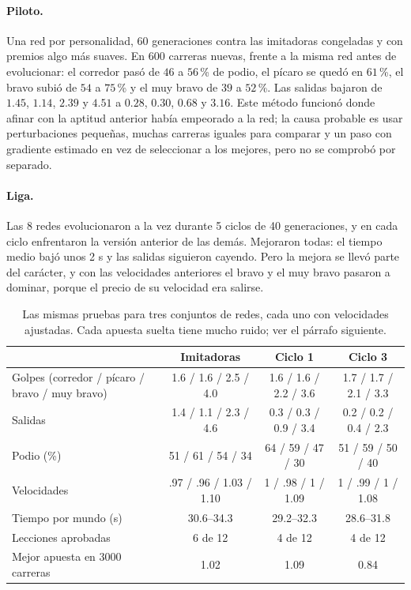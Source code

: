 \documentclass[11pt,letterpaper]{article}
\begin{document}
\paragraph{Piloto.} Una red por personalidad, 60 generaciones contra las imitadoras congeladas y con premios algo más suaves. En 600 carreras nuevas, frente a la misma red antes de evolucionar: el corredor pasó de $46$ a $56$\,\% de podio, el pícaro se quedó en $61$\,\%, el bravo subió de $54$ a $75$\,\% y el muy bravo de $39$ a $52$\,\%. Las salidas bajaron de $1.45$, $1.14$, $2.39$ y $4.51$ a $0.28$, $0.30$, $0.68$ y $3.16$. Este método funcionó donde afinar con la aptitud anterior había empeorado a la red; la causa probable es usar perturbaciones pequeñas, muchas carreras iguales para comparar y un paso con gradiente estimado en vez de seleccionar a los mejores, pero no se comprobó por separado.

\paragraph{Liga.} Las 8 redes evolucionaron a la vez durante 5 ciclos de 40 generaciones, y en cada ciclo enfrentaron la versión anterior de las demás. Mejoraron todas: el tiempo medio bajó unos 2 s y las salidas siguieron cayendo. Pero la mejora se llevó parte del carácter, y con las velocidades anteriores el bravo y el muy bravo pasaron a dominar, porque el precio de su velocidad era salirse.

\begin{table}[h]\centering\small
\begin{tabular}{lccc}
\toprule
 & Imitadoras & Ciclo 1 & Ciclo 3 \\
\midrule
Golpes (corredor / pícaro / bravo / muy bravo) & 1.6 / 1.6 / 2.5 / 4.0 & 1.6 / 1.6 / 2.2 / 3.6 & 1.7 / 1.7 / 2.1 / 3.3 \\
Salidas & 1.4 / 1.1 / 2.3 / 4.6 & 0.3 / 0.3 / 0.9 / 3.4 & 0.2 / 0.2 / 0.4 / 2.3 \\
Podio (\%) & 51 / 61 / 54 / 34 & 64 / 59 / 47 / 30 & 51 / 59 / 50 / 40 \\
Velocidades & .97 / .96 / 1.03 / 1.10 & 1 / .98 / 1 / 1.09 & 1 / .99 / 1 / 1.08 \\
Tiempo por mundo (s) & 30.6--34.3 & 29.2--32.3 & 28.6--31.8 \\
Lecciones aprobadas & 6 de 12 & 4 de 12 & 4 de 12 \\
Mejor apuesta en 3000 carreras & 1.02 & 1.09 & 0.84 \\
\bottomrule
\end{tabular}
\caption{Las mismas pruebas para tres conjuntos de redes, cada uno con velocidades ajustadas. Cada apuesta suelta tiene mucho ruido; ver el párrafo siguiente.}
\end{table}
\end{document}

